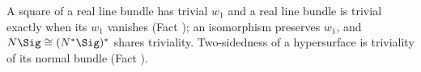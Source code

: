 A square of a real line bundle has trivial $w_1$ and a real line bundle is trivial exactly when its $w_1$ vanishes (Fact ); an isomorphism preserves $w_1$, and $N\Sig \cong (N^*\Sig)^*$ shares triviality. Two-sidedness of a hypersurface is triviality of its normal bundle (Fact ).
